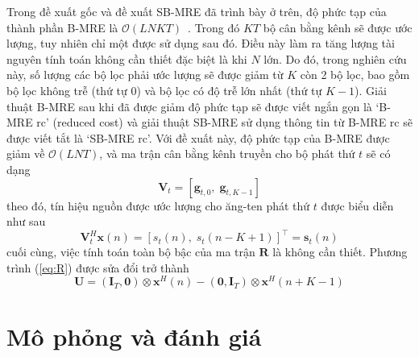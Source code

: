 Trong đề xuất gốc và đề xuất SB-MRE đã trình bày ở trên, độ phức tạp của thành phần B-MRE là $\mathcal{O}(LNKT)$~\cite{original}. Trong đó $KT$ bộ cân bằng kênh sẽ được ước lượng, tuy nhiên chỉ một được sử dụng sau đó. Điều này làm ra tăng lượng tài nguyên tính toán không cần thiết đặc biệt là khi $N$ lớn. Do đó, trong nghiên cứu này, số lượng các bộ lọc phải ước lượng sẽ được giảm từ $K$ còn 2 bộ lọc, bao gồm bộ lọc không trễ (thứ tự $0$) và bộ lọc có độ trễ lớn nhất (thứ tự $K-1$). Giải thuật B-MRE sau khi đã được giảm độ phức tạp sẽ được viết ngắn gọn là `B-MRE rc' (reduced cost) và giải thuật SB-MRE sử dụng thông tin từ B-MRE rc sẽ được viết tắt là `SB-MRE rc'. Với đề xuất này, độ phức tạp của B-MRE được giảm về $\mathcal{O}(LNT)$, và ma trận cân bằng kênh truyền cho bộ phát thứ $t$ sẽ có dạng
\begin{equation}
    \mathbf{V}_{t} = [\mathbf{g}_{t, 0}, \; \mathbf{g}_{t, K-1}]
\end{equation}
theo đó, tín hiệu nguồn được ước lượng cho ăng-ten phát thứ $t$ được biểu diễn như sau
\begin{equation}
    \mathbf{V}_t^H \mathbf{x}(n) = [s_t(n), \; s_t(n-K+1)]^\top = \mathbf{s}_{t}(n)
\end{equation}
cuối cùng, việc tính toán toàn bộ bậc của ma trận $\mathbf{R}$ là không cần thiết. Phương trình (\ref{eq:R}) được sửa đổi trở thành
\begin{equation}
\mathbf{U} = \left(\mathbf{I}_{T}, \mathbf{0}\right) \otimes \mathbf{x}^{H}(n)-\left(\mathbf{0}, \mathbf{I}_{T}\right) \otimes \mathbf{x}^{H}(n+K-1)
\end{equation}



\section{Mô phỏng và đánh giá}

